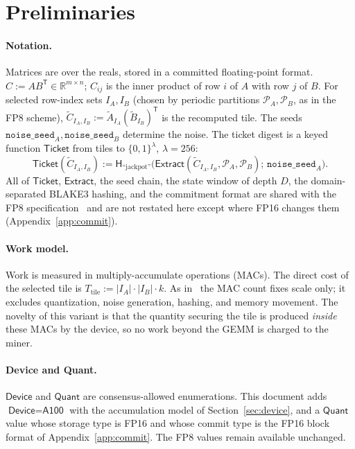 \documentclass[11pt]{article}
\newcommand{\Quant}{\textsf{Quant}}
\newcommand{\Device}{\textsf{Device}}
\newcommand{\Ticket}{\textsf{Ticket}}
\newcommand{\Extract}{\textsf{Extract}}
\newcommand{\Hb}{\mathsf{H}}
\newcommand{\Ct}{\widetilde{C}}
\newcommand{\At}{\widetilde{A}}
\newcommand{\Bt}{\widetilde{B}}
\newcommand{\T}{\mathsf{T}}
\newcommand{\R}{\mathbb{R}}
\newcommand{\FP}[1]{\textsf{FP#1}}
\begin{document}
\section{Preliminaries}\label{sec:prelim}

\paragraph{Notation.} Matrices are over the reals, stored in a committed floating-point format.
$C:=AB^\T\in\R^{m\times n}$; $C_{ij}$ is the inner product of row $i$ of $A$ with row $j$ of $B$.
For selected row-index sets $I_A,I_B$ (chosen by periodic partitions $\mathcal P_A,\mathcal P_B$,
as in the \FP{8} scheme), $\Ct_{I_A,I_B}:=\At_{I_A}(\Bt_{I_B})^\T$ is the recomputed tile. The
seeds $\texttt{noise\_seed}_A,\texttt{noise\_seed}_B$ determine the noise. The ticket digest is a
keyed function $\Ticket$ from tiles to $\{0,1\}^\lambda$, $\lambda=256$:
\[
\Ticket(\Ct_{I_A,I_B}) := \Hb_{\text{``jackpot''}}\big(\Extract(\Ct_{I_A,I_B},\mathcal P_A,\mathcal P_B);\,\texttt{noise\_seed}_A\big).
\]
All of $\Ticket$, $\Extract$, the seed chain, the state window of depth $D$, the domain-separated
BLAKE3 hashing, and the commitment format are shared with the \FP{8} specification~\cite{PearlFP8}
and are not restated here except where \FP{16} changes them (Appendix~\ref{app:commit}).

\paragraph{Work model.} Work is measured in multiply-accumulate operations (MACs). The direct
cost of the selected tile is $T_{\text{tile}}:=|I_A|\cdot|I_B|\cdot k$. As in~\cite{PearlFP8} the
MAC count fixes scale only; it excludes quantization, noise generation, hashing, and memory
movement. The novelty of this variant is that the quantity securing the tile is produced
\emph{inside} these MACs by the device, so no work beyond the GEMM is charged to the miner.

\paragraph{Device and Quant.} $\Device$ and $\Quant$ are consensus-allowed enumerations. This
document adds $\Device=\textsf{A100}$ with the accumulation model of Section~\ref{sec:device}, and
a $\Quant$ value whose storage type is \FP{16} and whose commit type is the \FP{16} block format
of Appendix~\ref{app:commit}. The \FP{8} values remain available unchanged.
\end{document}
